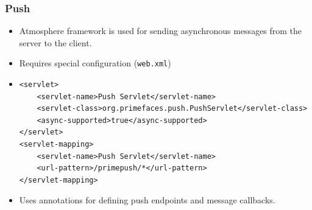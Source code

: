 \documentclass[10pt,xcolor=pdflatex]{beamer}
\begin{document}
\begin{frame}[containsverbatim]\frametitle{Push}
  \begin{itemize}
    \item Atmosphere framework is used for sending asynchronous messages from the server to the client.
	\item Requires special configuration (\texttt{web.xml})
	\item[] \begin{footnotesize} \begin{verbatim}
<servlet>
    <servlet-name>Push Servlet</servlet-name>
    <servlet-class>org.primefaces.push.PushServlet</servlet-class>
    <async-supported>true</async-supported>
</servlet>
<servlet-mapping>
    <servlet-name>Push Servlet</servlet-name>
    <url-pattern>/primepush/*</url-pattern>
</servlet-mapping>	
	\end{verbatim} \end{footnotesize}
    \item Uses annotations for defining push endpoints and message callbacks.
  \end{itemize}
\end{frame}
\end{document}
